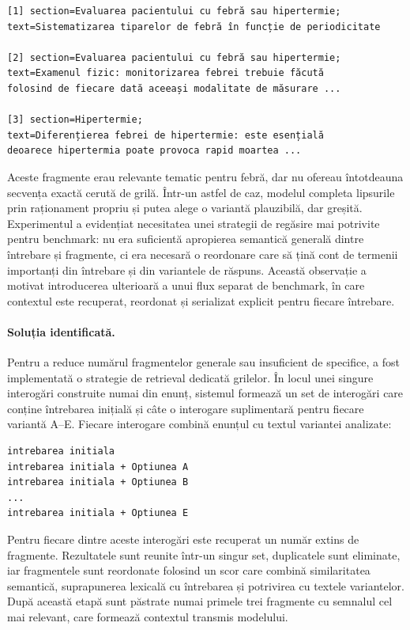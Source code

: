 \documentclass[12pt, a4paper, oneside, romanian]{teza-upb}
\begin{document}
\begin{lstlisting}[basicstyle=\ttfamily\footnotesize]
[1] section=Evaluarea pacientului cu febră sau hipertermie;
text=Sistematizarea tiparelor de febră în funcție de periodicitate

[2] section=Evaluarea pacientului cu febră sau hipertermie;
text=Examenul fizic: monitorizarea febrei trebuie făcută
folosind de fiecare dată aceeași modalitate de măsurare ...

[3] section=Hipertermie;
text=Diferențierea febrei de hipertermie: este esențială
deoarece hipertermia poate provoca rapid moartea ...
\end{lstlisting}

Aceste fragmente erau relevante tematic pentru febră, dar nu ofereau întotdeauna secvența exactă cerută de grilă. Într-un astfel de caz, modelul completa lipsurile prin raționament propriu și putea alege o variantă plauzibilă, dar greșită. Experimentul a evidențiat necesitatea unei strategii de regăsire mai potrivite pentru benchmark: nu era suficientă apropierea semantică generală dintre întrebare și fragmente, ci era necesară o reordonare care să țină cont de termenii importanți din întrebare și din variantele de răspuns. Această observație a motivat introducerea ulterioară a unui flux separat de benchmark, în care contextul este recuperat, reordonat și serializat explicit pentru fiecare întrebare.


\paragraph{Soluția identificată.}
Pentru a reduce numărul fragmentelor generale sau insuficient de specifice, a fost implementată o strategie de retrieval dedicată grilelor. În locul unei singure interogări construite numai din enunț, sistemul formează un set de interogări care conține întrebarea inițială și câte o interogare suplimentară pentru fiecare variantă A--E. Fiecare interogare combină enunțul cu textul variantei analizate:

\begin{lstlisting}[basicstyle=\ttfamily\footnotesize]
intrebarea initiala
intrebarea initiala + Optiunea A
intrebarea initiala + Optiunea B
...
intrebarea initiala + Optiunea E
\end{lstlisting}

Pentru fiecare dintre aceste interogări este recuperat un număr extins de fragmente. Rezultatele sunt reunite într-un singur set, duplicatele sunt eliminate, iar fragmentele sunt reordonate folosind un scor care combină similaritatea semantică, suprapunerea lexicală cu întrebarea și potrivirea cu textele variantelor. După această etapă sunt păstrate numai primele trei fragmente cu semnalul cel mai relevant, care formează contextul transmis modelului.
\end{document}

